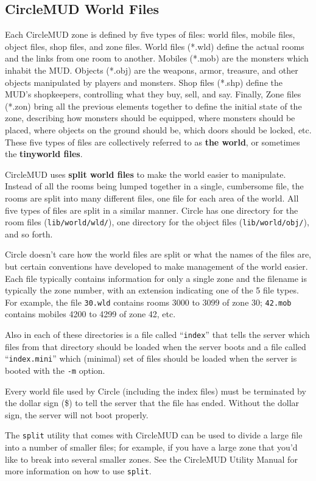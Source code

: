 \documentclass[11pt]{article}
\begin{document}
\subsection{CircleMUD World Files}
Each CircleMUD zone is defined by five types of files: world files, mobile files, object files, shop files, and zone files. World files (*.wld) define the actual rooms and the links from one room to another. Mobiles (*.mob) are the monsters which inhabit the MUD.  Objects (*.obj) are the weapons, armor, treasure, and other objects manipulated by players and monsters.  Shop files (*.shp) define the MUD's shopkeepers, controlling what they buy, sell, and say.  Finally, Zone files (*.zon) bring all the previous elements together to define the initial state of the zone, describing how monsters should be equipped, where monsters should be placed, where objects on the ground should be, which doors should be locked, etc.  These five types of files are collectively referred to as {\bf the world}, or sometimes the {\bf tinyworld files}.
\par
CircleMUD uses {\bf split world files} to make the world easier to manipulate.  Instead of all the rooms being lumped together in a single, cumbersome file, the rooms are split into many different files, one file for each area of the world.  All five types of files are split in a similar manner.  Circle has one directory for the room files (\texttt{lib/world/wld/}), one directory for the object files (\texttt{lib/world/obj/}), and so forth. 
\par
Circle doesn't care how the world files are split or what the names of the files are, but certain conventions have developed to make management of the world easier.  Each file typically contains information for only a single zone and the filename is typically the zone number, with an extension indicating one of the 5 file types.  For example, the file \texttt{30.wld} contains rooms 3000 to 3099 of zone 30; \texttt{42.mob} contains mobiles 4200 to 4299 of zone 42, etc.
\par
Also in each of these directories is a file called ``\texttt{index}'' that tells the server which files from that directory should be loaded when the server boots and a file called ``\texttt{index.mini}'' which (minimal) set of files should be loaded when the server is booted with the \texttt{-m} option. 
\par
Every world file used by Circle (including the index files) must be terminated by the dollar sign (\$) to tell the server that the file has ended.  Without the dollar sign, the server will not boot properly. 
\par
The \texttt{split} utility that comes with CircleMUD can be used to divide a large file into a number of smaller files; for example, if you have a large zone that you'd like to break into several smaller zones. See the CircleMUD Utility Manual for more information on how to use \texttt{split}.
\end{document}
